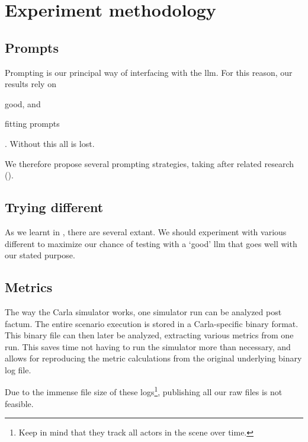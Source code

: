 \chapter{Experiment methodology}\label{sec:experiments}

\section{Prompts}

Prompting is our principal way of interfacing with the \acrshort{llm}. For this reason, our results
rely on \begin{inparaenum}
    \item good, and
    \item fitting prompts
\end{inparaenum}. Without this all is lost.

We therefore propose several prompting strategies, taking after related research ().

\section{Trying different }

As we learnt in , there are several  extant. We should
experiment with various different  to maximize our chance of testing with a `good'
\acrshort{llm} that goes well with our stated purpose.

\section{Metrics}

The way the Carla simulator works, one simulator run can be analyzed post factum. The entire
scenario execution is stored in a Carla-specific binary format. This binary file can then later be
analyzed, extracting various metrics from one run. This saves time not having to run the simulator
more than necessary, and allows for reproducing the metric calculations from the original underlying
binary log file.

Due to the immense file size of these logs\footnote{Keep in mind that they track all actors in the
    scene over time.}, publishing all our raw files is not feasible.
